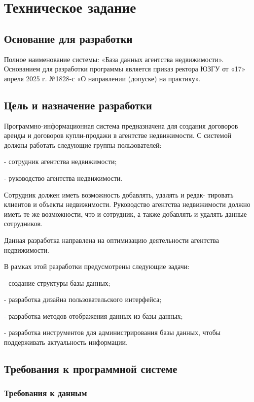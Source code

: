 \section{Техническое задание}
\subsection{Основание для разработки}

Полное наименование системы: «База данных агентства недвижимости».
Основанием для разработки программы является приказ ректора ЮЗГУ
от «17» апреля 2025 г. №1828-с «О направлении (допуске) на практику».

\subsection{Цель и назначение разработки}

Программно-информационная система предназначена для создания договоров аренды и договоров купли-продажи в агентстве недвижимости. С системой должны работать следующие группы пользователей:

-	сотрудник агентства недвижимости;

- руководство агентства недвижимости.

Сотрудник должен иметь возможность добавлять, удалять и редак- тировать клиентов и объекты недвижимости. Руководство агентства недвижимости должно иметь те же возможности, что и сотрудник, а также добавлять и удалять данные сотрудников.

Данная разработка направлена на оптимизацию деятельности агентства      недвижимости.

В рамках этой разработки предусмотрены следующие задачи:

-	создание структуры базы данных;

-	разработка дизайна пользовательского интерфейса;

-	разработка методов отображения данных из базы данных;

-	разработка инструментов для администрирования базы данных, чтобы поддерживать актуальность информации.


\subsection{Требования к программной системе}

\subsubsection{Требования к данным}

